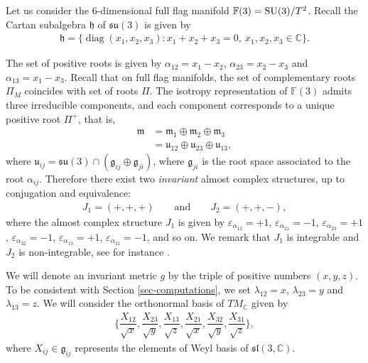 \documentclass[pdftex]{sigma}%
\numberwithin{equation}{section}
\DeclareMathOperator{\Diag}{diag}
\begin{document}
Let us consider the 6-dimensional full flag manifold $\mathbb{F}(3)={\rm SU}(3)/T^2$. Recall the Cartan subalgebra $\mathfrak{h}$ of $\mathfrak{su}(3)$ is given by
\begin{gather*}
\mathfrak{h}=\{\Diag(x_{1},x_{2},x_{3})\colon x_{1}+x_{2}+x_{3}=0,\ x_{1},x_{2},x_{3}\in\mathbb{C}\}.
\end{gather*}

The set of positive roots is given by $\alpha_{12}=x_{1}-x_{2}$, $\alpha_{23}=x_{2}-x_{3}$ and $\alpha_{13}=x_{1}-x_{3}$. Recall that on full flag manifolds, the set of complementary roots $\Pi_{M}$ coincides with set of roots $\Pi$. The isotropy representation of $\mathbb{F}(3)$ admits three irreducible components, and each component corresponds to a unique positive root $\Pi^{+}$, that is,
\begin{align*}
\mathfrak{m}&=\mathfrak{m}_{1}\oplus\mathfrak{m}_{2}\oplus \mathfrak{m}_{3}
\\
&=\mathfrak{u}_{12}\oplus \mathfrak{u}_{23}\oplus \mathfrak{u}_{13},
\end{align*}
where $\mathfrak{u}_{ij}=\mathfrak{su}(3)\cap (\mathfrak{g}_{ij}\oplus \mathfrak{g}_{ji})$, where $\mathfrak{g}_{ji}$ is the root space associated to the root $\alpha_{ij}$.
Therefore there exist two {\it invariant} almost complex structures, up to conjugation and equivalence:
\begin{gather*}
J_{1}=(+,+,+)\qquad \text{and}\qquad J_{2}=(+,+,-),
\end{gather*}
where the almost complex structure $J_1$ is given by $ \varepsilon_{\alpha_{12}} = +1$, $\varepsilon_{\alpha_{21}} = -1$, $\varepsilon_{\alpha_{23}} = +1$, $ \varepsilon_{\alpha_{32}} = -1$, $\varepsilon_{\alpha_{13}} = +1$, $\varepsilon_{\alpha_{31}} = -1$, and so on. We remark that $J_1$ is integrable and $J_2$ is non-integrable, see for instance \cite{sn}.

We will denote an invariant metric $g$ by the triple of positive numbers $(x,y,z)$. To be consistent with Section \ref{sec-computations}, we set $\lambda_{12}=x$, $\lambda_{23}=y$ and $\lambda_{13}=z$. We will consider the orthonormal basis of $TM_{\mathbb{C}}$ given by
\begin{gather*}
\bigg\{\dfrac{X_{12}}{\sqrt{x}},\dfrac{X_{23}}{\sqrt{y}},\dfrac{X_{13}}{\sqrt{z}},\dfrac{X_{21}}{\sqrt{x}},
\dfrac{X_{32}}{\sqrt{y}},\dfrac{X_{31}}{\sqrt{z}}\bigg\},
\end{gather*}
where $X_{ij}\in \mathfrak{g}_{ij}$ represents the elements of Weyl basis of $\mathfrak{sl}(3,\mathbb{C})$.
\end{document}
